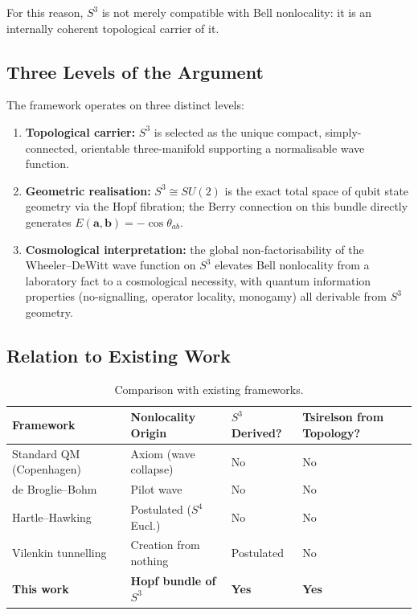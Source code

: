 \documentclass[12pt,a4paper]{article}
\theoremstyle{definition}
\theoremstyle{remark}
\begin{document}
For this reason, $S^3$ is not merely compatible with Bell nonlocality: it is an
internally coherent topological carrier of it.

\subsection{Three Levels of the Argument}

The framework operates on three distinct levels:

\begin{enumerate}
\item \textbf{Topological carrier:} $S^3$ is selected as the unique compact,
simply-connected, orientable three-manifold supporting a normalisable wave function.
\item \textbf{Geometric realisation:} $S^3\cong SU(2)$ is the exact total space of
qubit state geometry via the Hopf fibration; the Berry connection on this bundle
directly generates $E(\mathbf{a},\mathbf{b}) = -\cos\theta_{ab}$.
\item \textbf{Cosmological interpretation:} the global non-factorisability of the
Wheeler--DeWitt wave function on $S^3$ elevates Bell nonlocality from a laboratory
fact to a cosmological necessity, with quantum information properties (no-signalling,
operator locality, monogamy) all derivable from $S^3$ geometry.
\end{enumerate}

\subsection{Relation to Existing Work}

\begin{table}[h]
\centering
\renewcommand{\arraystretch}{1.4}
\begin{tabular}{p{4.2cm}p{3.5cm}p{1.8cm}p{3cm}}
\toprule
\textbf{Framework} & \textbf{Nonlocality Origin} & \textbf{$S^3$ Derived?} & \textbf{Tsirelson from Topology?} \\
\midrule
Standard QM (Copenhagen) & Axiom (wave collapse) & No & No \\
de Broglie--Bohm & Pilot wave & No & No \\
Hartle--Hawking & Postulated ($S^4$ Eucl.) & No & No \\
Vilenkin tunnelling & Creation from nothing & Postulated & No \\
\textbf{This work} & \textbf{Hopf bundle of $S^3$} & \textbf{Yes} & \textbf{Yes} \\
\bottomrule
\end{tabular}
\caption{Comparison with existing frameworks.}
\end{table}
\end{document}
